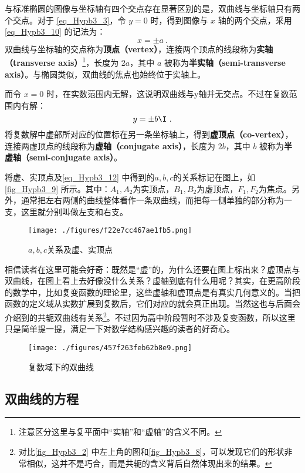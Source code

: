 与标准椭圆的图像与坐标轴有四个交点存在显著区别的是，双曲线与坐标轴只有两个交点。对于 \autoref{eq_Hypb3_3}，令 $y=0$ 时，得到图像与 $x$ 轴的两个交点，采用\autoref{eq_Hypb3_10} 的记法为：
\begin{equation}
x = \pm a~.
\end{equation}
双曲线与坐标轴的交点称为\textbf{顶点（vertex）}，连接两个顶点的线段称为\textbf{实轴（transverse axis）}\footnote{注意区分这里与复平面中“实轴”和“虚轴”的含义不同。}，长度为 $2a$，其中 $a$ 被称为\textbf{半实轴（semi-transverse axis）}。与椭圆类似，双曲线的焦点也始终位于实轴上。

而令 $x=0$ 时，在实数范围内无解，这说明双曲线与y轴并无交点。不过在复数范围内有解：
\begin{equation}
y = \pm  b\I~.
\end{equation}
将复数解中虚部所对应的位置标在另一条坐标轴上，得到\textbf{虚顶点（co-vertex）}，连接两虚顶点的线段称为\textbf{虚轴（conjugate axis）}，长度为 $2b$，其中 $b$ 被称为\textbf{半虚轴（semi-conjugate axis）}。

将虚、实顶点及\autoref{eq_Hypb3_12} 中得到的$a,b,c$的关系标记在图上，如\autoref{fig_Hypb3_9} 所示。其中：$A_1,A_2$为实顶点，$B_1,B_2$为虚顶点，$F_1,F_2$为焦点。另外，通常把左右两侧的曲线整体看作一条双曲线，而把每一侧单独的部分称为一支，这里就分别叫做左支和右支。
\begin{figure}[ht]
\centering
\texttt{[image: ./figures/f22e7cc467ae1fb5.png]}
\caption{$a,b,c$关系及虚、实顶点} \label{fig_Hypb3_9}
\end{figure}

相信读者在这里可能会好奇：既然是“虚”的，为什么还要在图上标出来？虚顶点与双曲线，在图上看上去好像没什么关系？虚轴到底有什么用呢？其实，在更高阶段的数学中，比如复变函数的理论里，这些虚轴和虚顶点是有真实几何意义的。当把函数的定义域从实数扩展到复数后，它们对应的就会真正出现。当然这也与后面会介绍到的共轭双曲线有关系\footnote{对比\autoref{fig_Hypb3_2} 中左上角的图和\autoref{fig_Hypb3_8}，可以发现它们的形状非常相似，这并不是巧合，而是共轭的含义背后自然体现出来的结果。}。不过因为高中阶段暂时不涉及复变函数，所以这里只是简单提一提，满足一下对数学结构感兴趣的读者的好奇心。

\begin{figure}[ht]
\centering
\texttt{[image: ./figures/457f263feb62b8e9.png]}
\caption{复数域下的双曲线} \label{fig_Hypb3_2}
\end{figure}

\subsection{双曲线的方程}

